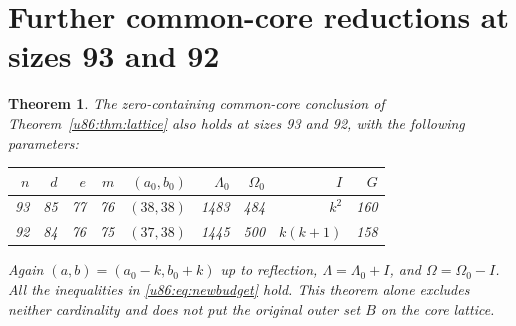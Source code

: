 \documentclass[11pt,a4paper]{article}
\newtheorem{theorem}{Theorem}[section]
\theoremstyle{remark}
\begin{document}
\section{Further common-core reductions at sizes 93 and 92}\label{u86:sec:lattice92}
\begin{theorem}\label{u86:thm:lattice92}
The zero-containing common-core conclusion of Theorem~\ref{u86:thm:lattice}
also holds at sizes 93 and 92, with the following parameters:
\begin{center}\small
\begin{tabular}{rrrrrrrrr}
\toprule
$n$&$d$&$e$&$m$&$(a_0,b_0)$&$\Lambda_0$&$\Omega_0$&$I$&$G$\\\midrule
93&85&77&76&$(38,38)$&1483&484&$k^2$&160\\
92&84&76&75&$(37,38)$&1445&500&$k(k+1)$&158\\\bottomrule
\end{tabular}
\end{center}
Again $(a,b)=(a_0-k,b_0+k)$ up to reflection,
$\Lambda=\Lambda_0+I$, and $\Omega=\Omega_0-I$.
All the inequalities in \eqref{u86:eq:newbudget} hold. This theorem alone
excludes neither cardinality and does not put the original outer set
$B$ on the core lattice.
\end{theorem}
\end{document}
